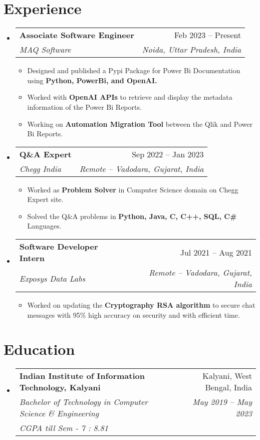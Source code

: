 \documentclass[a4paper,11pt]{article}
\makeatletter
\newcommand{\resumeItem}[1]{
  \item\small{#1}
}
\newcommand{\resumeItemListStart}{\begin{itemize}[rightmargin=0.11in]}
\newcommand{\resumeItemListEnd}{\end{itemize}}
\newcommand{\resumeQuadHeading}[4]{
  \item
  \begin{tabular*}{0.96\textwidth}[t]{l@{\extracolsep{\fill}}r}
    \textbf{#1} & #2 \\
    \textit{\small#3} & \textit{\small #4} \\
  \end{tabular*}
}
\newcommand{\resumeHexHeading}[6]{
  \item
  \begin{tabular*}{0.96\textwidth}[t]{l@{\extracolsep{\fill}}r}
    \textbf{#1} & #2 \\
    \textit{\small#3} & \textit{\small #4} \\
    \textit{\small#5} & \textit{\small #6} \\
  \end{tabular*}
}
\newcommand{\resumeHeadingListStart}{
  \begin{itemize}[leftmargin=0.15in, label={}]
}
\newcommand{\resumeHeadingListEnd}{\end{itemize}}
\makeatother
\begin{document}
\vspace{-5 mm}


\section{Experience}
\vspace{-1 mm}
\resumeHeadingListStart{}
  \resumeQuadHeading{Associate Software Engineer}{Feb 2023 -- Present}
  {MAQ Software}{Noida, Uttar Pradesh, India}
  \vspace{-1 mm}
    \resumeItemListStart{}
      \resumeItem{Designed and published a Pypi Package for Power Bi Documentation using \textbf{Python, PowerBi, and OpenAI.}}
      \resumeItem{Worked with \textbf{OpenAI APIs} to retrieve and display the metadata information of the Power Bi Reports.}
      \resumeItem{Working on \textbf{Automation Migration Tool} between the Qlik and Power Bi Reports.}
    \resumeItemListEnd{}

  \resumeQuadHeading{Q\&A Expert}{Sep 2022 -- Jan 2023}
  {Chegg India}{Remote -- Vadodara, Gujarat, India}
    \resumeItemListStart{}
    \vspace{-1 mm}
      \resumeItem{Worked as \textbf{Problem Solver} in Computer Science domain on Chegg Expert site.}
      \resumeItem{Solved the Q\&A problems in \textbf{Python, Java, C, C++, SQL, C\#} Languages.}
    \resumeItemListEnd{}

  \resumeQuadHeading{Software Developer Intern}{Jul 2021 -- Aug 2021}{Exposys Data Labs}{Remote -- Vadodara, Gujarat, India}
    \resumeItemListStart{}
    \vspace{-1 mm}
      \resumeItem{Worked on updating the \textbf{Cryptography RSA algorithm} to secure chat messages with 95\% high accuracy on security and with efficient time.}
    \resumeItemListEnd{}
\resumeHeadingListEnd{}

\vspace{-6 mm}


\section{Education}
\vspace{-1 mm}
  \resumeHeadingListStart{}
    \resumeHexHeading{Indian Institute of Information Technology, Kalyani}{Kalyani, West Bengal, India}{Bachelor of Technology in Computer Science \& Engineering}{May 2019 -- May 2023}{CGPA till Sem - 7 : 8.81}{}
  \resumeHeadingListEnd{}
\end{document}
